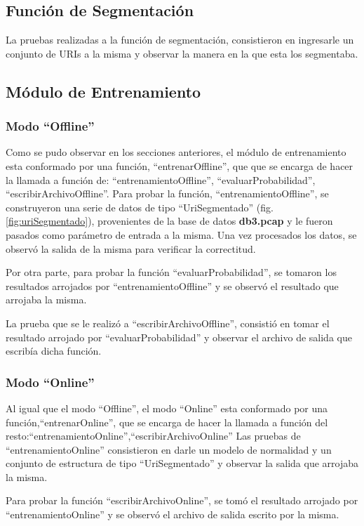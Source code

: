 \subsection*{Función de Segmentación}

La pruebas realizadas a la función de segmentación, consistieron en ingresarle un conjunto de URIs a la misma y observar la manera en la que
esta los segmentaba.

\subsection*{Módulo de Entrenamiento}
\subsubsection*{Modo ``Offline''}
Como se pudo observar en los secciones anteriores, el módulo de entrenamiento esta conformado por una función, ``entrenarOffline'', que que se
encarga de hacer la llamada a función de: ``entrenamientoOffline'', ``evaluarProbabilidad'', ``escribirArchivoOffline''.
Para probar la función, ``entrenamientoOffline'', se construyeron una serie de datos de tipo ``UriSegmentado'' (fig. \ref{fig:uriSegmentado}), provenientes de la base de datos \textbf{db3.pcap} y le fueron pasados como parámetro de entrada a la misma. Una vez procesados los datos, se observó la salida de la misma para verificar la correctitud.

Por otra parte, para probar la función ``evaluarProbabilidad'', se tomaron los resultados arrojados por ``entrenamientoOffline'' y se
observó el resultado que arrojaba la misma. 

La prueba que se le realizó a ``escribirArchivoOffline'', consistió en tomar el resultado arrojado por ``evaluarProbabilidad'' y observar el
archivo de salida que escribía dicha función. 

\subsubsection*{Modo ``Online''}
Al igual que el modo ``Offline'', el modo ``Online'' esta conformado por
una función,``entrenarOnline'', que se encarga de hacer la llamada a función
del resto:``entrenamientoOnline'',``escribirArchivoOnline''
Las pruebas de ``entrenamientoOnline'' consistieron en darle un modelo de normalidad y un conjunto de estructura
de tipo ``UriSegmentado'' y observar la salida que arrojaba la misma.

Para probar la función ``escribirArchivoOnline'', se tomó el resultado arrojado por ``entrenamientoOnline'' y se observó el archivo de salida escrito por la misma.
